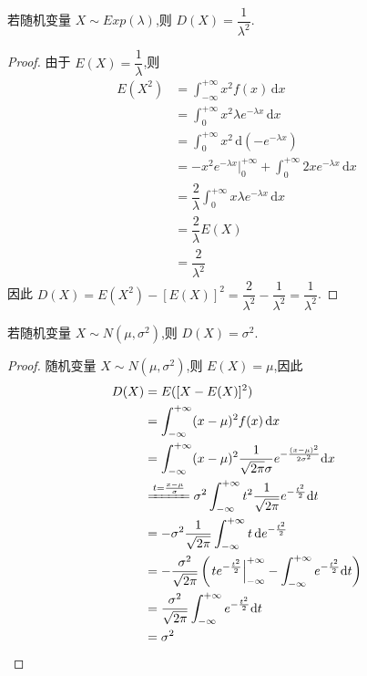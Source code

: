 \begin{conclusion}
    \indent 若随机变量 $X \sim Exp(\lambda)$,则 $D(X) = \dfrac{1}{\lambda^2}$.
\end{conclusion}

\begin{proof}
    由于 $E(X) = \dfrac{1}{\lambda}$,则
    $$
    \begin{aligned}
        E(X^2) &= \int_{-\infty}^{+\infty} x^2 f(x) \, \text{d}x \\
        &= \int_0^{+\infty} x^2 \lambda e^{-\lambda x} \, \text{d}x \\
        &= \int_0^{+\infty} x^2 \, \text{d}(-e^{-\lambda x}) \\
        &= -x^2 e^{-\lambda x} \Big|_0^{+\infty} + \int_0^{+\infty} 2x e^{-\lambda x} \, \text{d}x \\
        &= \dfrac{2}{\lambda} \int_0^{+\infty} x \lambda e^{-\lambda x} \, \text{d}x \\
        &= \dfrac{2}{\lambda} E(X) \\
        &= \dfrac{2}{\lambda^2}
    \end{aligned}
    $$
    因此 $D(X) = E(X^2) - [E(X)]^2 = \dfrac{2}{\lambda^2} - \dfrac{1}{\lambda^2} = \dfrac{1}{\lambda^2}$.
\end{proof}

\begin{conclusion}
    \indent 若随机变量 $X \sim N(\mu,\sigma^2)$,则 $D(X) = \sigma^2$.
\end{conclusion}

\begin{proof}
    随机变量 $X \sim N(\mu,\sigma^2)$,则 $E(X)=\mu$,因此
    $$
    \begin{aligned}
        D(X) &= E([X-E(X)]^2) \\
        &= \int_{-\infty}^{+\infty} (x-\mu)^2 f(x) \, \text{d}x \\
        &= \int_{-\infty}^{+\infty} (x-\mu)^2 \dfrac{1}{\sqrt{2 \pi} \sigma} e^{-\frac{(x-\mu)^2}{2 \sigma^2}} \text{d}x \\
        & \xlongequal{t = \frac{x-\mu}{\sigma}} \sigma^2 \int_{-\infty}^{+\infty} t^2 \dfrac{1}{\sqrt{2 \pi}} e^{-\frac{t^2}{2}} \text{d}t \\
        &= -\sigma^2 \dfrac{1}{\sqrt{2 \pi}} \int_{-\infty}^{+\infty} t \, \text{d} e^{-\frac{t^2}{2}} \\
        &= -\dfrac{\sigma^2}{\sqrt{2 \pi}} \left( \left. t e^{-\frac{t^2}{2}} \right|_{-\infty}^{+\infty} - \int_{-\infty}^{+\infty} e^{-\frac{t^2}{2}} \text{d}t \right) \\
        &= \dfrac{\sigma^2}{\sqrt{2 \pi}} \int_{-\infty}^{+\infty} e^{-\frac{t^2}{2}} \text{d}t \\
        &= \sigma^2
    \end{aligned}
    $$
\end{proof}


